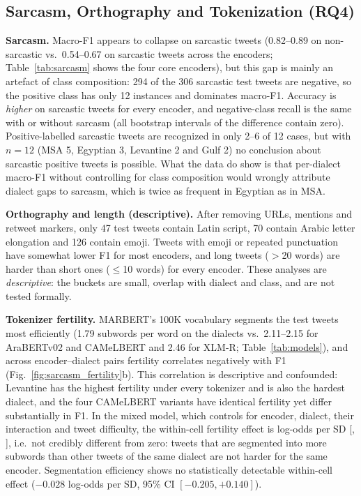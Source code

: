 \documentclass[11pt]{article}
\begin{document}
\subsection{Sarcasm, Orthography and Tokenization (RQ4)}
\label{sec:error_analysis}
\textbf{Sarcasm.} Macro-F1 appears to collapse on sarcastic tweets (0.82--0.89 on non-sarcastic vs.\ 0.54--0.67 on sarcastic tweets across the \nEnc{} encoders; Table~\ref{tab:sarcasm} shows the four core encoders), but this gap is mainly an artefact of class composition: 294 of the 306 sarcastic test tweets are negative, so the positive class has only 12 instances and dominates macro-F1. Accuracy is \emph{higher} on sarcastic tweets for every encoder, and negative-class recall is the same with or without sarcasm (all bootstrap intervals of the difference contain zero). Positive-labelled sarcastic tweets are recognized in only 2--6 of 12 cases, but with $n=12$ (MSA 5, Egyptian 3, Levantine 2 and Gulf 2) no conclusion about sarcastic positive tweets is possible. What the data do show is that per-dialect macro-F1 without controlling for class composition would wrongly attribute dialect gaps to sarcasm, which is twice as frequent in Egyptian as in MSA.

\begin{table}[tbp]
\caption{Pooled PID results on non-sarcastic / sarcastic test tweets. $\Delta$Rec.\,neg: non-sarcastic minus sarcastic negative-class recall with 95\% bootstrap interval.}
\label{tab:sarcasm}
\centering
\footnotesize
{}
\end{table}

\textbf{Orthography and length (descriptive).} After removing URLs, mentions and retweet markers, only 47 test tweets contain Latin script, 70 contain Arabic letter elongation and 126 contain emoji. Tweets with emoji or repeated punctuation have somewhat lower F1 for most encoders, and long tweets ($>$20 words) are harder than short ones ($\le$10 words) for every encoder. These analyses are \emph{descriptive}: the buckets are small, overlap with dialect and class, and are not tested formally.

\textbf{Tokenizer fertility.} MARBERT's 100K vocabulary segments the test tweets most efficiently (1.79 subwords per word on the dialects vs.\ 2.11--2.15 for AraBERTv02 and CAMeLBERT and 2.46 for XLM-R; Table~\ref{tab:models}), and across encoder--dialect pairs fertility correlates negatively with F1 (Fig.~\ref{fig:sarcasm_fertility}b). This correlation is descriptive and confounded: Levantine has the highest fertility under every tokenizer and is also the hardest dialect, and the four CAMeLBERT variants have identical fertility yet differ substantially in F1. In the mixed model, which controls for encoder, dialect, their interaction and tweet difficulty, the within-cell fertility effect is \glmmFert{} log-odds per SD [\glmmFertLo, \glmmFertHi], i.e.\ not credibly different from zero: tweets that are segmented into more subwords than other tweets of the same dialect are not harder for the same encoder. Segmentation efficiency shows no statistically detectable within-cell effect ($-0.028$ log-odds per SD, 95\% CI $[-0.205, +0.140]$).
\end{document}
